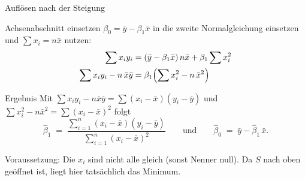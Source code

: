 \documentclass[aspectratio=169,11pt]{beamer}
\begin{document}
\begin{frame}{Auflösen nach der Steigung}
  \begin{block}{Achsenabschnitt einsetzen}
    $\beta_0 = \bar{y} - \beta_1 \bar{x}$ in die zweite Normalgleichung einsetzen
    und $\sum x_i = n\bar{x}$ nutzen:
    \begin{align*}
      \sum x_i y_i &= (\bar{y} - \beta_1 \bar{x})\, n\bar{x} + \beta_1 \sum x_i^{2} \\
      \sum x_i y_i - n\,\bar{x}\bar{y} &= \beta_1 \Bigl(\sum x_i^{2} - n\,\bar{x}^{2}\Bigr)
    \end{align*}
  \end{block}

  \begin{block}{Ergebnis}
    Mit $\sum x_i y_i - n\bar{x}\bar{y} = \sum (x_i - \bar{x})(y_i - \bar{y})$ und
    $\sum x_i^{2} - n\bar{x}^{2} = \sum (x_i - \bar{x})^{2}$ folgt
    \[
      \hat{\beta}_1 \;=\; \frac{\sum_{i=1}^{n} (x_i - \bar{x})(y_i - \bar{y})}
                              {\sum_{i=1}^{n} (x_i - \bar{x})^{2}}
      \qquad\text{und}\qquad
      \hat{\beta}_0 \;=\; \bar{y} - \hat{\beta}_1\,\bar{x}.
    \]
  \end{block}

  \footnotesize Voraussetzung: Die $x_i$ sind nicht alle gleich (sonst Nenner null).
  Da $S$ nach oben geöffnet ist, liegt hier tatsächlich das Minimum.
\end{frame}

\end{document}
